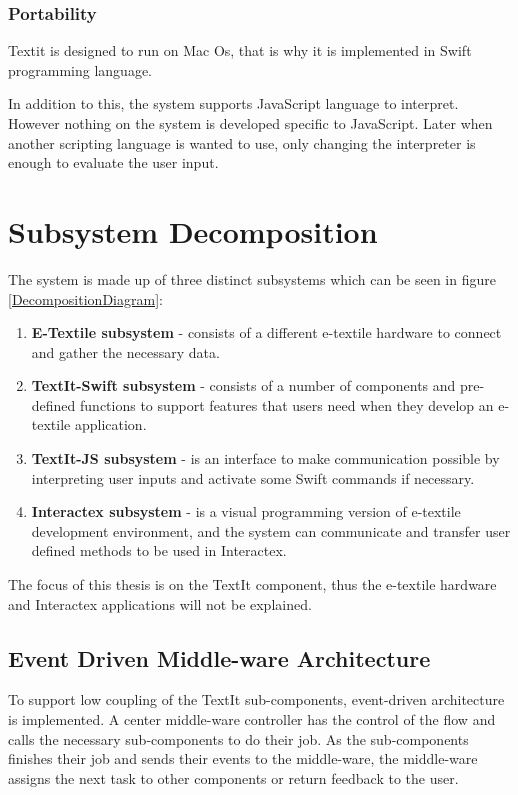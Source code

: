 	\subsubsection{Portability} 
	Textit is designed to run on Mac Os, that is why it is implemented in Swift programming language.
	
	In addition to this, the system supports JavaScript language to interpret. However nothing on the system is developed specific to JavaScript. Later when another scripting language is wanted to use, only changing the interpreter is enough to evaluate the user input.
		
\section{Subsystem Decomposition}
The system is made up of three distinct subsystems which can be seen in figure \ref{DecompositionDiagram}:
\begin{enumerate}
\item \textbf{E-Textile subsystem} - consists of a different e-textile hardware to connect and gather the necessary data.
\item \textbf{TextIt-Swift subsystem} - consists of a number of components and pre-defined functions to support features that users need when they develop an e-textile application.
\item \textbf{TextIt-JS subsystem} - is an interface to make communication possible by interpreting user inputs and activate some Swift commands if necessary.
\item \textbf{Interactex subsystem} - is a visual programming version of e-textile development environment, and the system can communicate and transfer user defined methods to be used in Interactex.
\end{enumerate}

The focus of this thesis is on the TextIt component, thus the e-textile hardware and Interactex applications will not be explained.


\subsection{Event Driven Middle-ware Architecture}
To support low coupling of the TextIt sub-components, event-driven architecture is implemented. A center middle-ware controller has the control of the flow and calls the necessary sub-components to do their job. As the sub-components finishes their job  and sends their events to the middle-ware, the middle-ware assigns the next task to other components or return feedback to the user.

